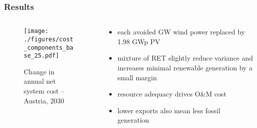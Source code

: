 \documentclass[aspectratio=1610, xcolor=dvipsnames]{beamer}
\begin{document}
    \begin{frame}
        \frametitle{Results}
        \begin{columns}[T]
            \begin{column}{10.6 cm}
                \begin{figure}
                    \caption{Change in annual net system cost -- Austria, 2030}
                    \texttt{[image: ./figures/cost\_components\_base\_25.pdf]} \label{fig:cost_breakdown}
                \end{figure}
            \end{column}
            \begin{column}{5.0 cm}
                \bigskip
                \begin{itemize}
                    \item each avoided GW wind power replaced by 1.98 GWp PV
                    \item mixture of RET slightly reduce variance and increases minimal renewable generation by a small margin
                    \item resource adequacy drives O\&M cost
                    \item lower exports also mean less fossil generation
                \end{itemize}
            \end{column}
        \end{columns}
    \end{frame}
\end{document}
